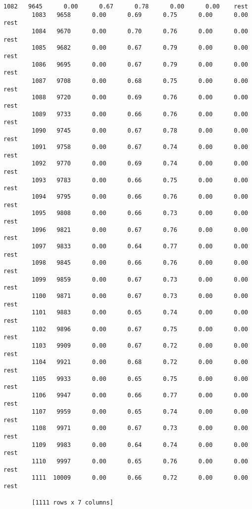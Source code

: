 \documentclass[11pt]{article}
\begin{document}
\begin{Verbatim}[commandchars=\\\{\}]
        1082   9645      0.00      0.67      0.78      0.00      0.00    rest
        1083   9658      0.00      0.69      0.75      0.00      0.00    rest
        1084   9670      0.00      0.70      0.76      0.00      0.00    rest
        1085   9682      0.00      0.67      0.79      0.00      0.00    rest
        1086   9695      0.00      0.67      0.79      0.00      0.00    rest
        1087   9708      0.00      0.68      0.75      0.00      0.00    rest
        1088   9720      0.00      0.69      0.76      0.00      0.00    rest
        1089   9733      0.00      0.66      0.76      0.00      0.00    rest
        1090   9745      0.00      0.67      0.78      0.00      0.00    rest
        1091   9758      0.00      0.67      0.74      0.00      0.00    rest
        1092   9770      0.00      0.69      0.74      0.00      0.00    rest
        1093   9783      0.00      0.66      0.75      0.00      0.00    rest
        1094   9795      0.00      0.66      0.76      0.00      0.00    rest
        1095   9808      0.00      0.66      0.73      0.00      0.00    rest
        1096   9821      0.00      0.67      0.76      0.00      0.00    rest
        1097   9833      0.00      0.64      0.77      0.00      0.00    rest
        1098   9845      0.00      0.66      0.76      0.00      0.00    rest
        1099   9859      0.00      0.67      0.73      0.00      0.00    rest
        1100   9871      0.00      0.67      0.73      0.00      0.00    rest
        1101   9883      0.00      0.65      0.74      0.00      0.00    rest
        1102   9896      0.00      0.67      0.75      0.00      0.00    rest
        1103   9909      0.00      0.67      0.72      0.00      0.00    rest
        1104   9921      0.00      0.68      0.72      0.00      0.00    rest
        1105   9933      0.00      0.65      0.75      0.00      0.00    rest
        1106   9947      0.00      0.66      0.77      0.00      0.00    rest
        1107   9959      0.00      0.65      0.74      0.00      0.00    rest
        1108   9971      0.00      0.67      0.73      0.00      0.00    rest
        1109   9983      0.00      0.64      0.74      0.00      0.00    rest
        1110   9997      0.00      0.65      0.76      0.00      0.00    rest
        1111  10009      0.00      0.66      0.72      0.00      0.00    rest
        
        [1111 rows x 7 columns]
\end{Verbatim}
            
\end{document}
